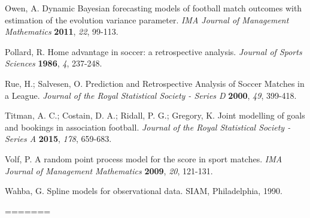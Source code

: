 \documentclass[journal,article,accept,moreauthors,pdftex,12pt,a4paper]{mdpi}
\begin{document}
\begin{thebibliography}{999}
		Owen, A. Dynamic Bayesian forecasting models of football match
		outcomes with estimation of the evolution variance parameter. {\em
			IMA Journal of Management Mathematics} {\bf 2011}, {\em 22}, 99-113.
		
		Pollard, R. Home advantage in soccer: a retrospective analysis. {\em Journal of Sports Sciences} {\bf 1986}, {\em 4}, 237-248.
		
		Rue, H.; Salvesen, O. Prediction and Retrospective Analysis of
		Soccer Matches in a League. {\em Journal of the Royal Statistical
			Society - Series D} {\bf 2000}, {\em 49}, 399-418.
		
		Titman, A. C.; Costain, D. A.; Ridall, P. G.; Gregory, K. Joint
		modelling of goals and bookings in association football. {\em
			Journal of the Royal Statistical Society - Series A} {\bf 2015},
		{\em 178}, 659-683.
		
		Volf, P. A random point process model for the score in sport
		matches. {\em IMA Journal of Management Mathematics} {\bf 2009},
		{\em 20}, 121-131.
		
		Wahba, G. Spline models for observational data. SIAM, Philadelphia,
		1990.
		
	\end{thebibliography}
	
	
	
	
	
	
=======

\end{document}
